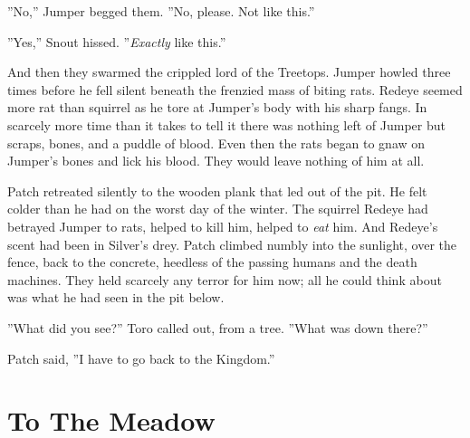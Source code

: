 \documentclass[12pt]{book}
\begin{document}
 ''No,'' Jumper begged them. ''No, please. Not like this.''\par
 ''Yes,'' Snout hissed. ''{\it Exactly} like this.''\par
 And then they swarmed the crippled lord of the Treetops. Jumper howled three times before he fell silent beneath the frenzied mass of biting rats. Redeye seemed more rat than squirrel as he tore at Jumper's body with his sharp fangs. In scarcely more time than it takes to tell it there was nothing left of Jumper but scraps, bones, and a puddle of blood. Even then the rats began to gnaw on Jumper's bones and lick his blood. They would leave nothing of him at all.\par
 Patch retreated silently to the wooden plank that led out of the pit. He felt colder than he had on the worst day of the winter. The squirrel Redeye had betrayed Jumper to rats, helped to kill him, helped to {\it eat} him. And Redeye's scent had been in Silver's drey. Patch climbed numbly into the sunlight, over the fence, back to the concrete, heedless of the passing humans and the death machines. They held scarcely any terror for him now; all he could think about was what he had seen in the pit below.\par
 ''What did you see?'' Toro called out, from a tree. ''What was down there?''\par
 Patch said, ''I have to go back to the Kingdom.''\par

\section{To The Meadow}
\end{document}
